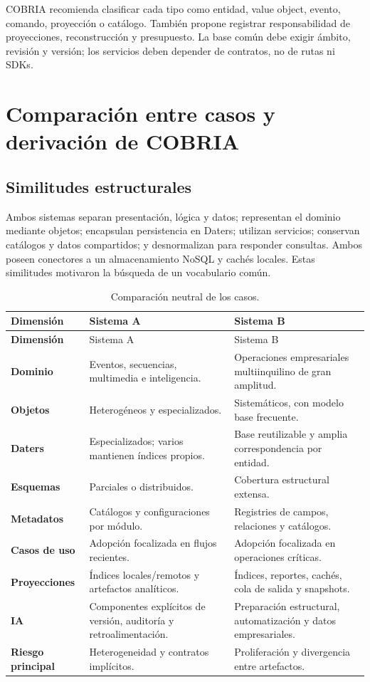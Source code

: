 COBRIA recomienda clasificar cada tipo como entidad, value object, evento, comando,
proyección o catálogo. También propone registrar responsabilidad de proyecciones, reconstrucción
y presupuesto. La base común debe exigir ámbito, revisión y versión; los servicios deben
depender de contratos, no de rutas ni SDKs.

\chapter{Comparación entre casos y derivación de COBRIA}

\section{Similitudes estructurales}

Ambos sistemas separan presentación, lógica y datos; representan el dominio mediante
objetos; encapsulan persistencia en Daters; utilizan servicios; conservan catálogos y
datos compartidos; y desnormalizan para responder consultas. Ambos poseen conectores a
un almacenamiento NoSQL y cachés locales. Estas similitudes motivaron la búsqueda de un
vocabulario común.

\begin{longtable}{>{\bfseries}p{3.2cm}p{5.6cm}p{5.6cm}}
\caption{Comparación neutral de los casos.}\label{tab:comparacion-casos}\\
\toprule
Dimensión & Sistema A & Sistema B \\
\midrule
\endfirsthead
\toprule
Dimensión & Sistema A & Sistema B \\
\midrule
\endhead
Dominio & Eventos, secuencias, multimedia e inteligencia. & Operaciones empresariales
multiinquilino de gran amplitud.\\
Objetos & Heterogéneos y especializados. & Sistemáticos, con modelo base frecuente.\\
Daters & Especializados; varios mantienen índices propios. & Base reutilizable y amplia
correspondencia por entidad.\\
Esquemas & Parciales o distribuidos. & Cobertura estructural extensa.\\
Metadatos & Catálogos y configuraciones por módulo. & Registries de campos, relaciones y
catálogos.\\
Casos de uso & Adopción focalizada en flujos recientes. & Adopción focalizada en
operaciones críticas.\\
Proyecciones & Índices locales/remotos y artefactos analíticos. & Índices, reportes,
cachés, cola de salida y snapshots.\\
IA & Componentes explícitos de versión, auditoría y retroalimentación. & Preparación estructural,
automatización y datos empresariales.\\
Riesgo principal & Heterogeneidad y contratos implícitos. & Proliferación y divergencia
entre artefactos.\\
\bottomrule
\end{longtable}

